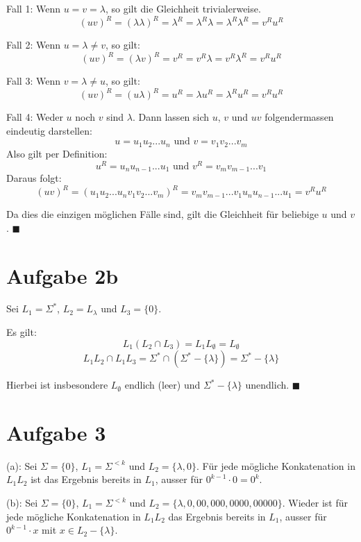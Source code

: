 \documentclass[a4paper]{article}
\begin{document}
	Fall 1: Wenn $u = v = \lambda$, so gilt die Gleichheit trivialerweise.
	\[(uv)^R = (\lambda\lambda)^R = \lambda^R = \lambda^R \lambda = \lambda^R \lambda^R = v^R u^R\]

	Fall 2: Wenn $u = \lambda \neq v$, so gilt:
	\[(uv)^R = (\lambda v)^R = v^R = v^R \lambda = v^R \lambda^R = v^R u^R\]

	Fall 3: Wenn $v = \lambda \neq u$, so gilt:
	\[(uv)^R = (u \lambda)^R = u^R = \lambda u^R = \lambda^R u^R = v^R u^R\]
	
	Fall 4: Weder $u$ noch $v$ sind $\lambda$.
	Dann lassen sich $u$, $v$ und $uv$ folgendermassen eindeutig darstellen:
	\[u = u_{1}u_{2}...u_{n} \text{ und } v = v_{1}v_{2}...v_{m} \]
	Also gilt per Definition:
	\[u^R = u_{n}u_{n-1}...u_{1} \text{ und } v^R = v_{m}v_{m-1}...v_{1}\]
	Daraus folgt:
	\[(uv)^R = (u_{1}u_{2}...u_{n}v_{1}v_{2}...v_{m})^R 
	= v_{m}v_{m-1}...v_{1}u_{n}u_{n-1}...u_{1} = v^R u^R\]

	Da dies die einzigen möglichen Fälle sind, gilt die Gleichheit für beliebige $u$ und $v$. $\blacksquare$

\section{Aufgabe 2b}
	Sei $L_{1} = \Sigma^*$, $ L_{2} = L_{\lambda}$ und $ L_{3} = \big\{ 0 \big\}$.

	Es gilt:
	\[L_{1}(L_{2} \cap L_{3}) = L_{1}L_{\emptyset} = L_{\emptyset}\]
	\[L_{1}L_{2} \cap L_{1}L_{3} = \Sigma^* \cap (\Sigma^* - \big\{ \lambda \big\}) = \Sigma^* - \big\{ \lambda \big\}\]

	Hierbei ist insbesondere $L_{\emptyset}$ endlich (leer) und $\Sigma^* - \big\{ \lambda \big\}$ unendlich. $\blacksquare$

\section{Aufgabe 3}
	(a): Sei $\Sigma = \big\{ 0 \big\}$, $L_{1} = \Sigma^{< k}$ und $L_{2} = \big\{ \lambda, 0 \big\}$.
	Für jede mögliche Konkatenation in $L_{1}L_{2}$ ist das Ergebnis bereits in $L_{1}$, ausser 
	für $0^{k-1} \cdot 0 = 0^k$.

	(b): Sei $\Sigma = \big\{ 0 \big\}$, $L_{1} = \Sigma^{< k}$ und $L_{2} = \big\{ \lambda, 0, 00, 000, 0000, 00000 \big\}$.
	Wieder ist für jede mögliche Konkatenation in $L_{1}L_{2}$ das Ergebnis bereits in $L_{1}$, ausser
	für $0^{k-1} \cdot x$ mit $x \in L_{2} - \big\{ \lambda \big\}$.
	
\end{document}
